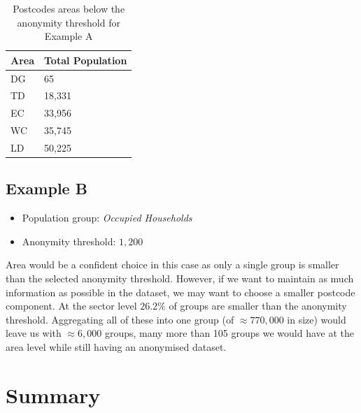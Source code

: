 \documentclass[12pt, a4paper]{article}
\begin{document}
\begin{table}
\begin{center}
\begin{tabular}{ll}
    \toprule
    Area &  Total Population \\
    \midrule
    DG   &                65 \\
    TD   &             18,331 \\
    EC   &             33,956 \\
    WC   &             35,745 \\
    LD   &             50,225 \\
    \bottomrule
\end{tabular}
\caption{Postcodes areas below the anonymity threshold for Example A}\label{table:example_a}
\end{center}
\end{table}

\subsection{Example B}

\begin{itemize}
    \item Population group: \textit{Occupied Households}
    \item Anonymity threshold: $1,200$
\end{itemize}

Area would be a confident choice in this case as only a single group is smaller than the selected anonymity threshold. However, if we want to maintain as much information as possible in the dataset, we may want to choose a smaller postcode component. At the sector level $26.2\%$ of groups are smaller than the anonymity threshold. Aggregating all of these into one group (of $\approx770,000$ in size) would leave us with $\approx6,000$ groups, many more than 105 groups we would have at the area level while still having an anonymised dataset.

\section{Summary}
\end{document}
